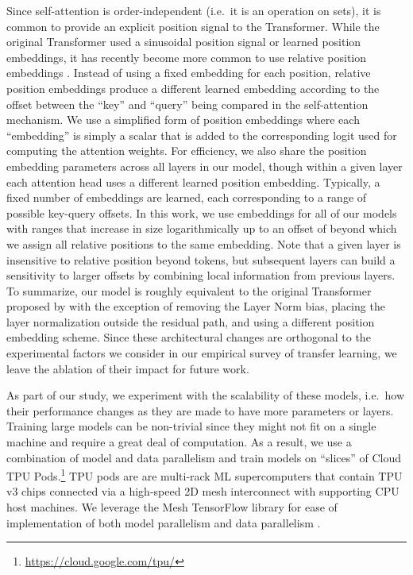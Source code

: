 \documentclass[twoside,11pt]{article}
\begin{document}
Since self-attention is order-independent (i.e.\ it is an operation on sets), it is common to provide an explicit position signal to the Transformer.
While the original Transformer used a sinusoidal position signal or learned position embeddings, it has recently become more common to use relative position embeddings \citep{shaw2018self,huang2018music}.
Instead of using a fixed embedding for each position, relative position embeddings produce a different learned embedding according to the offset between the ``key'' and ``query'' being compared in the self-attention mechanism.
We use a simplified form of position embeddings where each ``embedding'' is simply a scalar that is added to the corresponding logit used for computing the attention weights.
For efficiency, we also share the position embedding parameters across all layers in our model, though within a given layer each attention head uses a different learned position embedding.
Typically, a fixed number of embeddings are learned, each corresponding to a range of possible key-query offsets.
In this work, we use  embeddings for all of our models with ranges that increase in size logarithmically up to an offset of  beyond which we assign all relative positions to the same embedding.
Note that a given layer is insensitive to relative position beyond  tokens, but subsequent layers can build a sensitivity to larger offsets by combining local information from previous layers.
To summarize, our model is roughly equivalent to the original Transformer proposed by \citet{vaswani2017attention} with the exception of removing the Layer Norm bias, placing the layer normalization outside the residual path, and using a different position embedding scheme.
Since these architectural changes are orthogonal to the experimental factors we consider in our empirical survey of transfer learning, we leave the ablation of their impact for future work.

As part of our study, we experiment with the scalability of these models, i.e.\ how their performance changes as they are made to have more parameters or layers.
Training large models can be non-trivial since they might not fit on a single machine and require a great deal of computation.
As a result, we use a combination of model and data parallelism and train models on ``slices'' of Cloud TPU Pods.\footnote{\url{https://cloud.google.com/tpu/}}
TPU pods are are multi-rack ML supercomputers that contain  TPU v3 chips connected via a high-speed 2D mesh interconnect with supporting CPU host machines.
We leverage the Mesh TensorFlow library \citep{shazeer2018mesh} for ease of implementation of both model parallelism and data parallelism \citep{krizhevsky2014one}.
\end{document}
